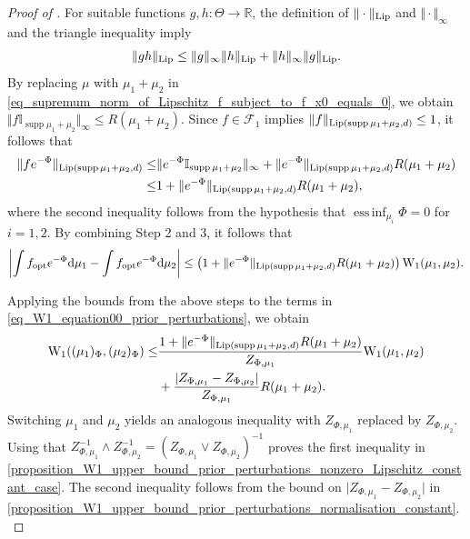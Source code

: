 \documentclass[a4paper]{scrartcl}
\theoremstyle{definition}
\numberwithin{equation}{section}
\newcommand{\R}{\mathbb{R}}
\newcommand{\rd}{\mathrm{d}}
\DeclareMathOperator{\supp}{supp}
\DeclareMathOperator*{\essinf}{ess\,inf}
\newcommand{\abs}[1]{\vert #1\vert}
\newcommand{\Abs}[1]{\left\vert#1\right\vert}
\newcommand{\norm}[1]{\Vert #1 \Vert}
\newcommand{\Lip}[0]{\textup{Lip}}
\newcommand{\Was}[0]{\textup{W}}
\newcommand{\opt}[0]{\textup{opt}}
\begin{document}
\begin{proof}[Proof of ]
For suitable functions $g,h:\Theta\to\R$, the definition of $\norm{\cdot}_{\Lip}$ and $\norm{\cdot}_\infty$ and the triangle inequality imply 
  \begin{equation}
  \label{eq_Lipschitz_norm_of_product}
   \norm{gh}_{\Lip}\leq \norm{g}_\infty\norm{h}_{\Lip}+\norm{h}_\infty\norm{g}_{\Lip}.
  \end{equation}
By replacing $\mu$ with $\mu_1+\mu_2$ in \eqref{eq_supremum_norm_of_Lipschitz_f_subject_to_f_x0_equals_0}, we obtain $\norm{f\mathbb{I}_{\supp{\mu_1+\mu_2}}}_\infty\leq R(\mu_1+\mu_2)$.
Since $f\in\mathcal{F}_1$ implies $\norm{f}_{\Lip(\supp{\mu_1+\mu_2,d})}\leq 1$, it follows that
 \begin{align*}
  \norm{fe^{-\Phi}}_{\Lip(\supp{\mu_1+\mu_2},d)} \leq& \norm{e^{-\Phi}\mathbb{I}_{\supp{\mu_1+\mu_2}}}_\infty +\norm{e^{-\Phi}}_{\Lip(\supp{\mu_1+\mu_2},d)} R(\mu_1+\mu_2)
  \\
  \leq & 1+\norm{e^{-\Phi}}_{\Lip(\supp{\mu_1+\mu_2},d)} R(\mu_1+\mu_2) ,
 \end{align*}
where the second inequality follows from the hypothesis that $\essinf_{\mu_i}\Phi=0$ for $i=1,2$. 
By combining Step 2 and 3, it follows that
 \begin{align*}
 \Abs{\int f_\opt e^{-\Phi}\rd \mu_1-\int f_\opt e^{-\Phi}\rd \mu_2}\leq \left(1+\norm{e^{-\Phi}}_{\Lip(\supp{\mu_1+\mu_2},d)} R(\mu_1+\mu_2)\right) \Was_1(\mu_1,\mu_2).
\end{align*}
 
 Applying the bounds from the above steps to the terms in \eqref{eq_W1_equation00_prior_perturbations}, we obtain
 \begin{align*}
   \Was_1((\mu_1)_\Phi,(\mu_2)_\Phi) \leq &
   \frac{1+\norm{e^{-\Phi}}_{\Lip(\supp{\mu_1+\mu_2},d)} R(\mu_1+\mu_2)}{Z_{\Phi,\mu_1}} \Was_1(\mu_1,\mu_2)
   \\
   &+\frac{\abs{Z_{\Phi,\mu_1}-Z_{\Phi,\mu_2}}}{Z_{\Phi,\mu_1}} R(\mu_1+\mu_2).
 \end{align*}
Switching $\mu_1$ and $\mu_2$ yields an analogous inequality with $Z_{\Phi,\mu_1}$ replaced by $Z_{\Phi,\mu_2}$.
Using that $Z_{\Phi,\mu_1}^{-1}\wedge Z_{\Phi,\mu_2}^{-1}=(Z_{\Phi,\mu_1}\vee Z_{\Phi,\mu_2})^{-1}$ proves the first inequality in \ref{proposition_W1_upper_bound_prior_perturbations_nonzero_Lipschitz_constant_case}.
The second inequality follows from the bound on $\abs{Z_{\Phi,\mu_1}-Z_{\Phi,\mu_2}}$ in  \cref{proposition_W1_upper_bound_prior_perturbations_normalisation_constant}.
\end{proof}
\end{document}
